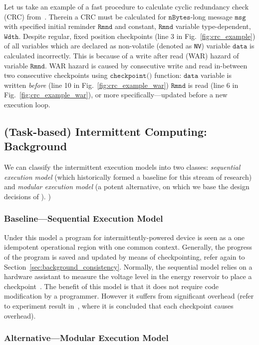 Let us take an example of a fast procedure to calculate cyclic redundancy check (CRC) from~\cite{hicks_mibench2_2016}. Therein a CRC must be calculated for $\texttt{nBytes}$-long message $\texttt{msg}$ with specified initial reminder $\texttt{Rmnd}$ and constant, $\texttt{Rmnd}$ variable type-dependent, $\texttt{Wdth}$. Despite regular, fixed position checkpoints (line 3 in Fig.~\ref{fig:crc_example}) of all variables which are declared as non-volatile (denoted as \texttt{NV}) variable $\texttt{data}$ is calculated incorrectly. This is because of a write after read (WAR) hazard of variable $\texttt{Rmnd}$. WAR hazard is caused by consecutive write and read in-between two consecutive checkpoints using $\texttt{checkpoint()}$ function: $\texttt{data}$ variable is written \emph{before} (line 10 in Fig.~\ref{fig:crc_example_war}) $\texttt{Rmnd}$ is read (line 6 in Fig.~\ref{fig:crc_example_war}), or more specifically---updated before a new execution loop. 

\subsection{(Task-based) Intermittent Computing: Background}

We can classify the intermittent execution models into two classes: \emph{sequential execution model} (which historically formed a baseline for this stream of research) and \emph{modular execution model} (a potent alternative, on which we base the design decisions of \sys).
)
\subsubsection{Baseline---Sequential Execution Model}

Under this model a program for intermittently-powered device is seen as a one idempotent operational region with one common context. Generally, the progress of the program is saved and updated by means of checkpointing, refer again to Section~\ref{sec:background_consistency}. Normally, the sequential model relies on a hardware assistant to measure the voltage level in the energy reservoir to place a checkpoint~\cite{mementos,mottola2017harvos,hibernus}. The benefit of this model is that it does not require code modification by a programmer. However it suffers from significant overhead (refer to experiment result in~\cite[Fig. 3]{chain}, where it is concluded that each checkpoint causes overhead).

\subsubsection{Alternative---Modular Execution Model}

